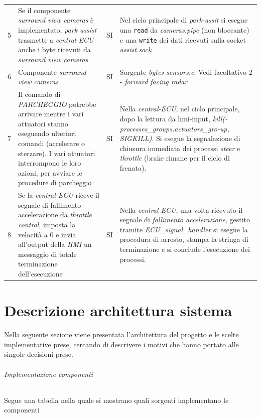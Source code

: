 \documentclass[11pt, openany]{article}
\theoremstyle{definition}
\theoremstyle{plain}
\theoremstyle{remark}
\begin{document}
\begin{tcolorbox}[width=\textwidth,move upwards= -16pt , colback={Cornsilk2}]
\begin{tabularx}{\textwidth}{lXcX}
					5	&	Se il componente \textit{surround view cameras} è implementato, \textit{park assist} trasmette a \textit{central-ECU} anche i byte ricevuti da \textit{surround view cameras}	&	SI	&
					Nel ciclo principale di \textit{park-assit} si esegue una \texttt{read} da \textit{cameras.pipe} (non bloccante) e una \texttt{write} dei dati ricevuti sulla socket \textit{assist.sock} \\\vspace{0.1cm}
					6	&	Componente \textit{surround view cameras}	&	SI	&
					Sorgente \textit{bytes-sensors.c}. Vedi facoltativo 2 - \textit{forward facing radar}	\\\vspace{0.1cm}
					7	&	Il comando di \textit{PARCHEGGIO} potrebbe arrivare mentre i vari attuatori stanno eseguendo ulteriori comandi (accelerare o sterzare). I vari attuatori interrompono le loro azioni, per avviare le procedure di parcheggio	&	SI	&
					Nella \textit{central-ECU}, nel ciclo principale, dopo la lettura da hmi-input, \textit{kill(-processes\_groups.actuators\_gro-up, SIGKILL)}. Si esegue la segnalazione di chiusura immediata dei processi  \textit{steer} e \textit{throttle} (brake rimane per il ciclo di frenata).\\
					8	&	Se la \textit{central-ECU }riceve il segnale di fallimento accelerazione da \textit{throttle control}, imposta la velocità a 0 e invia all'output della \textit{HMI} un messaggio di totale terminazione dell'esecuzione	&	SI	&
					Nella \textit{central-ECU}, una volta ricevuto il segnale di \textit{fallimento accelerazione}, gestito tramite \textit{ECU\_signal\_handler} si esegue la procedura di arresto, stampa la stringa di terminazione e si conclude l'esecuzione dei processi.

				\end{tabularx}
				\label{tab:facoltativi}
			\end{tcolorbox}
	\part{Descrizione architettura sistema}
		Nella seguente sezione viene presentata l'architettura del progetto e le scelte implementative prese, cercando di descrivere i motivi che hanno portato alle singole decisioni prese.

		\paragraph{Implementazione componenti}
			\footnotesize Segue una tabella nella quale si mostrano quali sorgenti implementano le componenti
			\normalsize
\end{document}
